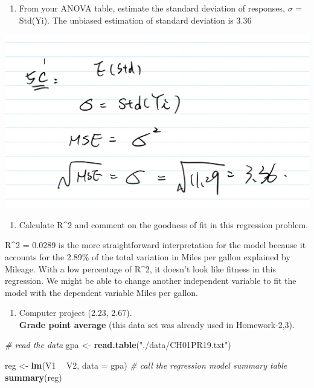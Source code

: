 \documentclass[
]{article}
\newenvironment{Shaded}{\begin{snugshade}}{\end{snugshade}}
\newcommand{\CommentTok}[1]{\textcolor[rgb]{0.56,0.35,0.01}{\textit{#1}}}
\newcommand{\DataTypeTok}[1]{\textcolor[rgb]{0.13,0.29,0.53}{#1}}
\newcommand{\KeywordTok}[1]{\textcolor[rgb]{0.13,0.29,0.53}{\textbf{#1}}}
\newcommand{\NormalTok}[1]{#1}
\newcommand{\OperatorTok}[1]{\textcolor[rgb]{0.81,0.36,0.00}{\textbf{#1}}}
\newcommand{\StringTok}[1]{\textcolor[rgb]{0.31,0.60,0.02}{#1}}
\providecommand{\tightlist}{%
  \setlength{\itemsep}{0pt}\setlength{\parskip}{0pt}}
\begin{document}
\begin{enumerate}
\def\labelenumi{(\alph{enumi})}
\setcounter{enumi}{2}
\tightlist
\item
  From your ANOVA table, estimate the standard deviation of responses,
  \(\sigma\) = Std(Yi). The unbiased estimation of standard deviation is
  3.36
\end{enumerate}

\includegraphics{pics/Screen Shot 2021-02-21 at 8.21.54 PM.png}

\begin{enumerate}
\def\labelenumi{(\alph{enumi})}
\setcounter{enumi}{3}
\tightlist
\item
  Calculate R\^{}2 and comment on the goodness of fit in this regression
  problem.
\end{enumerate}

R\^{}2 = 0.0289 is the more straightforward interpretation for the model
because it accounts for the 2.89\% of the total variation in Miles per
gallon explained by Mileage. With a low percentage of R\^{}2, it doesn't
look like fitness in this regression. We might be able to change another
independent variable to fit the model with the dependent variable Miles
per gallon.

\begin{enumerate}
\def\labelenumi{\arabic{enumi}.}
\setcounter{enumi}{5}
\tightlist
\item
  Computer project (2.23, 2.67).\\
  \textbf{Grade point average} (this data set was already used in
  Homework-2,3).
\end{enumerate}

\begin{Shaded}
\begin{Highlighting}[]
\CommentTok{# read the data}
\NormalTok{gpa <-}\StringTok{ }\KeywordTok{read.table}\NormalTok{(}\StringTok{"./data/CH01PR19.txt"}\NormalTok{)}

\NormalTok{reg <-}\StringTok{ }\KeywordTok{lm}\NormalTok{(V1 }\OperatorTok{~}\StringTok{ }\NormalTok{V2, }\DataTypeTok{data =}\NormalTok{ gpa)}
\CommentTok{# call the regression model summary table}
\KeywordTok{summary}\NormalTok{(reg)}
\end{Highlighting}
\end{Shaded}
\end{document}
